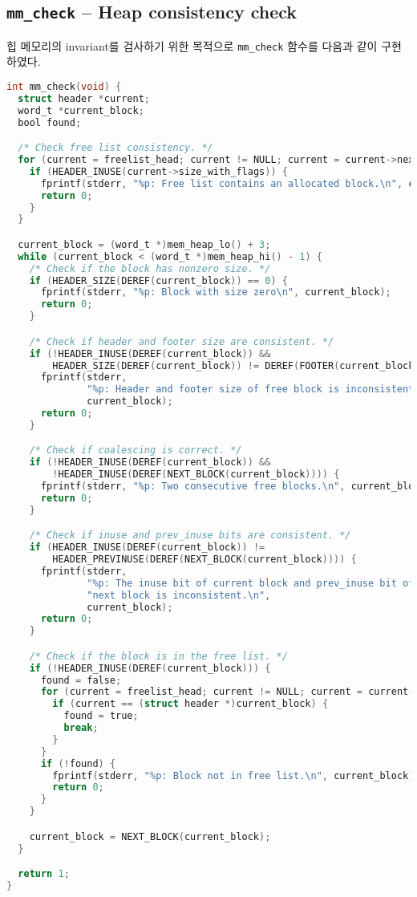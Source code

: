 \documentclass{scrartcl}
\begin{document}
\subsection{\texttt{mm\_check} -- Heap consistency check}
힙 메모리의 invariant를 검사하기 위한 목적으로 \texttt{mm\_check} 함수를 다음과
같이 구현하였다.
\begin{lstlisting}[language=C]
int mm_check(void) {
  struct header *current;
  word_t *current_block;
  bool found;

  /* Check free list consistency. */
  for (current = freelist_head; current != NULL; current = current->next) {
    if (HEADER_INUSE(current->size_with_flags)) {
      fprintf(stderr, "%p: Free list contains an allocated block.\n", current);
      return 0;
    }
  }

  current_block = (word_t *)mem_heap_lo() + 3;
  while (current_block < (word_t *)mem_heap_hi() - 1) {
    /* Check if the block has nonzero size. */
    if (HEADER_SIZE(DEREF(current_block)) == 0) {
      fprintf(stderr, "%p: Block with size zero\n", current_block);
      return 0;
    }

    /* Check if header and footer size are consistent. */
    if (!HEADER_INUSE(DEREF(current_block)) &&
        HEADER_SIZE(DEREF(current_block)) != DEREF(FOOTER(current_block))) {
      fprintf(stderr,
              "%p: Header and footer size of free block is inconsistent.\n",
              current_block);
      return 0;
    }

    /* Check if coalescing is correct. */
    if (!HEADER_INUSE(DEREF(current_block)) &&
        !HEADER_INUSE(DEREF(NEXT_BLOCK(current_block)))) {
      fprintf(stderr, "%p: Two consecutive free blocks.\n", current_block);
      return 0;
    }

    /* Check if inuse and prev_inuse bits are consistent. */
    if (HEADER_INUSE(DEREF(current_block)) !=
        HEADER_PREVINUSE(DEREF(NEXT_BLOCK(current_block)))) {
      fprintf(stderr,
              "%p: The inuse bit of current block and prev_inuse bit of the "
              "next block is inconsistent.\n",
              current_block);
      return 0;
    }

    /* Check if the block is in the free list. */
    if (!HEADER_INUSE(DEREF(current_block))) {
      found = false;
      for (current = freelist_head; current != NULL; current = current->next) {
        if (current == (struct header *)current_block) {
          found = true;
          break;
        }
      }
      if (!found) {
        fprintf(stderr, "%p: Block not in free list.\n", current_block);
        return 0;
      }
    }

    current_block = NEXT_BLOCK(current_block);
  }

  return 1;
}
\end{lstlisting}
\end{document}
